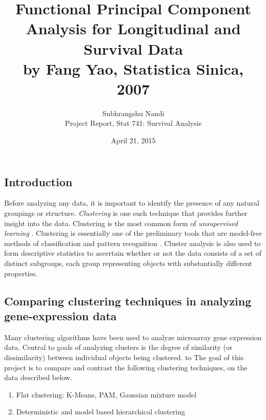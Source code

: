 \documentclass[11pt]{extarticle} %
\begin{document}

\title{Functional Principal Component Analysis for Longitudinal and Survival Data\\ by Fang Yao, Statistica Sinica, 2007}
\author{Subhrangshu Nandi\\
  Project Report, 
  Stat 741: Survival Analysis}
\date{April 21, 2015}

\maketitle


\subsection*{Introduction}
Before analyzing any data, it is important to identify the presence of any natural groupings or structure. {\emph{Clustering}} is one such technique that provides further insight into the data. Clustering is the most common form of {\emph{unsupervised learning}} \citep{Manning_etal_2008_Information}. Clustering is essentially one of the preliminary tools that are model-free methods of classification and pattern recognition \citep{Hastie_etal_2009_Elements}. Cluster analysis is also used to form descriptive statistics to ascertain whether or not the data consists of a set of distinct subgroups, each group representing objects with substantially different properties.

\subsection*{Comparing clustering techniques in analyzing gene-expression data}
Many clustering algorithms have been used to analyze microarray gene expression data. Central to goals of analyzing clusters is the degree of similarity (or dissimilarity) between individual objects being clustered. to The goal of this project is to compare and contrast the following clustering techniques, on the data described below.
\begin{enumerate}
\item Flat clustering: K-Means, PAM, Gaussian mixture model
\item Deterministic and model based hierarchical clustering
\end{enumerate}
\end{document}
